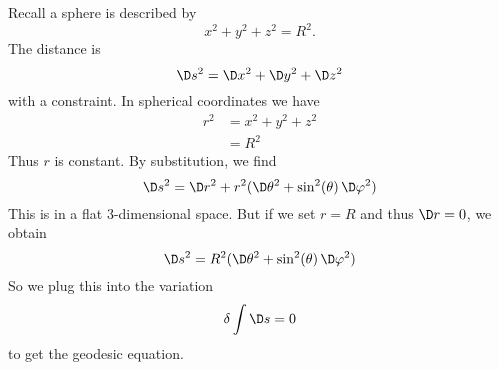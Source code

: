 \begin{ex}[Sphere]
Recall a sphere is described by
\begin{equation}
x^2+y^2+z^2=R^2.
\end{equation}
The distance is
\begin{equation}
\D s^2=\D x^2 + \D y^2+\D z^2
\end{equation}
with a constraint. In spherical coordinates we have
\begin{equation}
\begin{split}
r^{2}&=x^2+y^2+z^2\\
&=R^2
\end{split}
\end{equation}
Thus $r$ is constant. By substitution, we find
\begin{equation}
\D s^2=\D r^2+r^2(\D\theta^2+\sin^{2}(\theta)\,\D\varphi^2)
\end{equation}
This is in a flat 3-dimensional space. But if we set $r=R$ and
thus $\D r=0$, we obtain
\begin{equation}
\D s^2=R^2(\D\theta^2+\sin^{2}(\theta)\,\D\varphi^2)
\end{equation}
So we plug this into the variation
\begin{equation}
\delta\int\D s=0
\end{equation}
to get the geodesic equation.
\end{ex}
